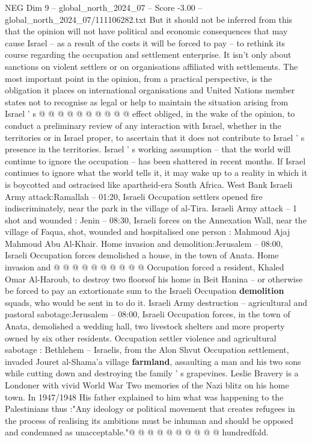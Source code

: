 \begin{textsample}{NEG Dim 9 – global\_north\_2024\_07 – Score -3.00 – global\_north\_2024\_07/111106282.txt}
But it should not be inferred from this that the opinion will not have political and economic consequences that may cause Israel -- as a result of the costs it will be forced to pay -- to rethink its course regarding the occupation and settlement enterprise.
It isn't only about sanctions on violent settlers or on organisations affiliated with settlements.
The most important point in the opinion, from a practical perspective, is the obligation it places on international organisations and United Nations member states not to recognise as legal or help to maintain the situation arising from Israel ' s @ @ @ @ @ @ @ @ @ @ effect obliged, in the wake of the opinion, to conduct a preliminary review of any interaction with Israel, whether in the territories or in Israel proper, to ascertain that it does not contribute to Israel ' s presence in the territories.
Israel ' s working assumption -- that the world will continue to ignore the occupation -- has been shattered in recent months.
If Israel continues to ignore what the world tells it, it may wake up to a reality in which it is boycotted and ostracised like apartheid-era South Africa.
West Bank Israeli Army attack:Ramallah -- 01:20, Israeli Occupation settlers opened fire indiscriminately, near the park in the village of al-Tira.
Israeli Army attack -- 1 shot and wounded : Jenin -- 08:30, Israeli forces on the Annexation Wall, near the village of Faqua, shot, wounded and hospitalised one person : Mahmoud Ajaj Mahmoud Abu Al-Khair.
Home invasion and demolition:Jerusalem -- 08:00, Israeli Occupation forces demolished a house, in the town of Anata.
Home invasion and @ @ @ @ @ @ @ @ @ @ Occupation forced a resident, Khaled Omar Al-Haroub, to destroy two floorsof his home in Beit Hanina -- or otherwise be forced to pay an extortionate sum to the Israeli Occupation \textbf{demolition} squads, who would be sent in to do it.
Israeli Army destruction -- agricultural and pastoral sabotage:Jerusalem -- 08:00, Israeli Occupation forces, in the town of Anata, demolished a wedding hall, two livestock shelters and more property owned by six other residents.
Occupation settler violence and agricultural sabotage : Bethlehem -- Israelis, from the Alon Shvut Occupation settlement, invaded Jouret al-Shama'a village \textbf{farmland}, assaulting a man and his two sons while cutting down and destroying the family ' s grapevines.
Leslie Bravery is a Londoner with vivid World War Two memories of the Nazi blitz on his home town.
In 1947/1948 His father explained to him what was happening to the Palestinians thus :"Any ideology or political movement that creates refugees in the process of realising its ambitions must be inhuman and should be opposed and condemned as unacceptable."@ @ @ @ @ @ @ @ @ @ hundredfold.

\end{textsample}
